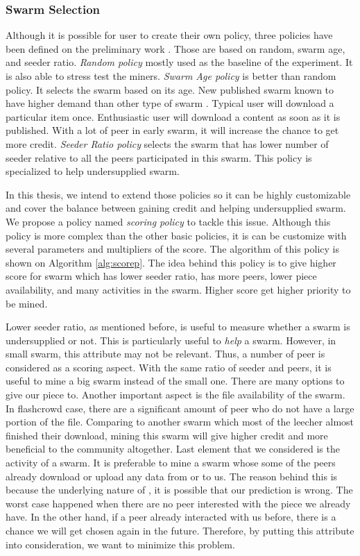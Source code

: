 \subsubsection{Swarm Selection}
Although it is possible for user to create their own policy, three policies have been defined on the preliminary work \cite{2015:creditmining:capota}. Those are based on random, swarm age, and seeder ratio. \textit{Random policy} mostly used as the baseline of the experiment. It is also able to stress test the miners. \textit{Swarm Age policy} is better than random policy. It selects the swarm based on its age. New published swarm known to have higher demand than other type of swarm \cite{2012:economicbt:kash}. Typical user will download a particular item once. Enthusiastic user will download a content as soon as it is published. With a lot of peer in early swarm, it will increase the chance to get more credit. \textit{Seeder Ratio policy} selects the swarm that has lower number of seeder relative to all the peers participated in this swarm. This policy is specialized to help undersupplied swarm. 

In this thesis, we intend to extend those policies so it can be highly customizable and cover the balance between gaining credit and helping undersupplied swarm. We propose a policy named \textit{scoring policy} to tackle this issue. Although this policy is more complex than the other basic policies, it is can be customize with several parameters and multipliers of the score. The algorithm of this policy is shown on Algorithm \ref{alg:scorep}. The idea behind this policy is to give higher score for swarm which has lower seeder ratio, has more peers, lower piece availability, and many activities in the swarm. Higher score get higher priority to be mined.

Lower seeder ratio, as mentioned before, is useful to measure whether a swarm is undersupplied or not. This is particularly useful to \textit{help} a swarm. However, in small swarm, this attribute may not be relevant. Thus, a number of peer is considered as a scoring aspect. With the same ratio of seeder and peers, it is useful to mine a big swarm instead of the small one. There are many options to give our piece to. Another important aspect is the file availability of the swarm. In flashcrowd case, there are a significant amount of peer who do not have a large portion of the file. Comparing to another swarm which most of the leecher almost finished their download, mining this swarm will give higher credit and more beneficial to the community altogether. Last element that we considered is the activity of a swarm. It is preferable to mine a swarm whose some of the peers already download or upload any data from or to us. The reason behind this is because the underlying nature of \bt, it is possible that our prediction is wrong. The worst case happened when there are no peer interested with the piece we already have. In the other hand, if a peer already interacted with us before, there is a chance we will get chosen again in the future. Therefore, by putting this attribute into consideration, we want to minimize this problem.

